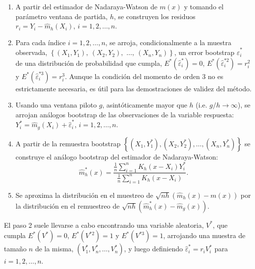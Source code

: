 \documentclass[]{book}
\theoremstyle{break}
\theoremstyle{definition}
\theoremstyle{definition}
\theoremstyle{definition}
\theoremstyle{remark}
\begin{document}
\begin{enumerate}
\def\labelenumi{\arabic{enumi}.}
\item
  A partir del estimador de Nadaraya-Watson de \(m\left( x \right)\) y
  tomando el parámetro ventana de partida, \(h\), se construyen los
  residuos \(r_i = Y_i - \hat{m}_{h}\left( X_i \right)\),
  \(i=1, 2, \ldots, n\).
\item
  Para cada índice \(i=1,2,\ldots ,n\), se arroja, condicionalmente a la
  muestra observada,
  \(\left\{ \left( X_1,Y_1 \right), \ \left( X_2,Y_2 \right),\right.\)
  \(\left.\ldots ,\ \left( X_n,Y_n \right) \right\}\), un error
  bootstrap \(\hat{\varepsilon}_i^{\ast}\) de una distribución de
  probabilidad que cumpla,
  \(E^{\ast}\left( \hat{\varepsilon}_i^{\ast} \right) =0\),
  \(E^{\ast}\left( \hat{\varepsilon}_i^{\ast 2} \right) =r_i^2\) y
  \(E^{\ast}\left( \hat{\varepsilon}_i^{\ast 3} \right) =r_i^{3}\).
  Aunque la condición del momento de orden 3 no es estrictamente
  necesaria, es útil para las demostraciones de validez del método.
\item
  Usando una ventana piloto \(g\), asintóticamente mayor que \(h\) (i.e.
  \(g/h\rightarrow \infty\)), se arrojan análogos bootstrap de las
  observaciones de la variable respuesta:
  \(Y_i^{\ast}=\hat{m}_{g}\left(X_i \right)  +\hat{\varepsilon}_i^{\ast}\),
  \(i=1,2,\ldots ,n\).
\item
  A partir de la remuestra bootstrap
  \(\left\{ \left( X_1,Y_1^{\ast } \right),\left( X_2,Y_2^{\ast} \right),\ldots ,\left( X_n,Y_n^{\ast} \right) \right\}\)
  se construye el análogo bootstrap del estimador de Nadaraya-Watson:
  \[\hat{m}_{h}^{\ast}\left( x \right) =\frac{\frac{1}{n}\sum_{i=1}^{n}K_{h}
  \left( x-X_i \right) Y_i^{\ast}}{\frac{1}{n}\sum_{i=1}^{n}K_{h}\left(
  x-X_i \right)}.\]
\item
  Se aproxima la distribución en el muestreo de
  \(\sqrt{nh}\left( \hat{m}_{h}\left( x \right) -m\left( x \right) \right)\)
  por la distribución en el remuestreo de
  \(\sqrt{nh}\left( \hat{m}_{h}^{\ast}\left( x \right) - \hat{m}_{g}\left( x \right) \right)\).
\end{enumerate}

El paso 2 suele llevarse a cabo encontrando una variable aleatoria,
\(V^{\ast}\), que cumpla \(E^{\ast}\left( V^{\ast} \right) =0\),
\(E^{\ast}\left( V^{\ast 2} \right) =1\) y
\(E^{\ast}\left( V^{\ast 3} \right) =1\), arrojando una muestra de
tamaño \(n\) de la misma,
\(\left( V_1^{\ast},V_n^{\ast},\ldots ,V_n^{\ast} \right)\), y luego
definiendo \(\hat{\varepsilon}_i^{\ast} = r_iV_i^{\ast}\) para
\(i=1, 2, \ldots, n\).
\end{document}
